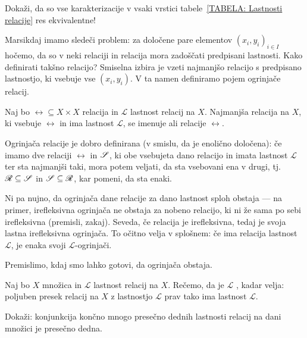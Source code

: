                 \begin{vaja}
                        Dokaži, da so vse karakterizacije v vsaki vrstici tabele~\ref{TABELA: Lastnosti relacije} res ekvivalentne!
                \end{vaja}

                Marsikdaj imamo sledeči problem: za določene pare elementov $(x_i, y_i)_{i \in I}$ hočemo, da so v neki relaciji in relacija mora zadoščati predpisani lastnosti. Kako definirati takšno relacijo? Smiselna izbira je vzeti najmanjšo relacijo s predpisano lastnostjo, ki vsebuje vse $(x_i, y_i)$. V ta namen definiramo pojem ogrinjače relacij.

                \begin{definicija}
                        Naj bo $\rel \subseteq X \times X$ relacija in $\mathscr{L}$ lastnost relacij na $X$. Najmanjša relacija na $X$, ki vsebuje $\rel$ in ima lastnost $\mathscr{L}$, se imenuje  ali  relacije $\rel$.
                \end{definicija}

                Ogrinjača relacije je dobro definirana (v smislu, da je enolično določena): če imamo dve relaciji $\rel$ in $\srel$, ki obe vsebujeta dano relacijo in imata lastnost $\mathscr{L}$ ter sta najmanjši taki, mora potem veljati, da sta vsebovani ena v drugi, tj.~$\rel \subseteq \srel$ in $\srel \subseteq \rel$, kar pomeni, da sta enaki.

                Ni pa nujno, da ogrinjača dane relacije za dano lastnost sploh obstaja --- na primer, irefleksivna ogrinjača ne obstaja za nobeno relacijo, ki ni že sama po sebi irefleksivna (premisli, zakaj). Seveda, če relacija je irefleksivna, tedaj je svoja lastna irefleksivna ogrinjača. To očitno velja v splošnem: če ima relacija lastnost $\mathscr{L}$, je enaka svoji $\mathscr{L}$-ogrinjači.

                Premislimo, kdaj smo lahko gotovi, da ogrinjača obstaja.

                \begin{definicija}
                        Naj bo $X$ množica in $\mathscr{L}$ lastnost relacij na $X$. Rečemo, da je $\mathscr{L}$ , kadar velja: poljuben presek relacij na $X$ z lastnostjo $\mathscr{L}$ prav tako ima lastnost $\mathscr{L}$.
                \end{definicija}

                \begin{vaja}\label{VAJA: presečna dednost zaprta za konjunkcije}
                        Dokaži: konjunkcija končno mnogo presečno dednih lastnosti relacij na dani množici je presečno dedna.
                \end{vaja}

